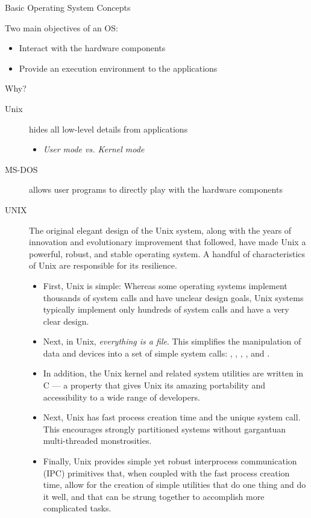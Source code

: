 \begin{frame}{Basic Operating System Concepts}
  \begin{exampleblock}{Two main objectives of an OS:}
    \begin{itemize}
    \item Interact with the hardware components
    \item Provide an execution environment to the applications
    \end{itemize}
  \end{exampleblock}
  \begin{exampleblock}{Why?}
    \begin{description}
    \item[Unix] hides all low-level details from applications
      \begin{itemize}
      \item[] \emph{User mode vs. Kernel mode}
      \end{itemize}
    \item[MS-DOS] allows user programs to directly play with the hardware components
    \end{description}
  \end{exampleblock}
\end{frame}

\begin{description}
\item[UNIX] The original elegant design of the Unix system, along with the years of
  innovation and evolutionary improvement that followed, have made Unix a powerful,
  robust, and stable operating system. A handful of characteristics of Unix are
  responsible for its resilience.\cite{love2010linux}
  \begin{itemize}
  \item First, Unix is simple: Whereas some operating systems implement thousands of
    system calls and have unclear design goals, Unix systems typically implement only
    hundreds of system calls and have a very clear design.
  \item Next, in Unix, \emph{everything is a file}. This simplifies the manipulation of
    data and devices into a set of simple system calls: , ,
    , , and .
  \item In addition, the Unix kernel and related system utilities are written in C --- a
    property that gives Unix its amazing portability and accessibility to a wide range of
    developers.
  \item Next, Unix has fast process creation time and the unique  system
    call. This encourages strongly partitioned systems without gargantuan multi-threaded
    monstrosities.
  \item Finally, Unix provides simple yet robust interprocess communication (IPC)
    primitives that, when coupled with the fast process creation time, allow for the
    creation of simple utilities that do one thing and do it well, and that can be strung
    together to accomplish more complicated tasks.
  \end{itemize}
\end{description}

